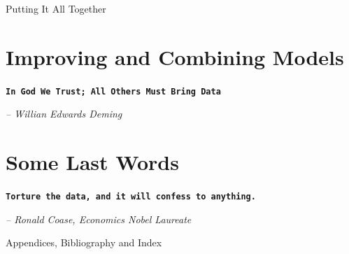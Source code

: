 \documentclass[11pt, letterpaper, twoside]{memoir}\usepackage{knitr}
\makeatletter
\newcommand{\chapterendsymbol}{
    \vspace{24pt}
    \Huge
    \hrulefill \hspace{0.1in} \hspace{0.1in} \hrulefill
    \normalsize
    }
\renewcommand\part{%
  \if@openright
    \cleardoublepage
  \else
    \clearpage
  \fi
  \thispagestyle{empty}
  \null\vfil
  \secdef\@part\@spart
  }
\makeatother
\begin{document}
\vspace{12pt}

\chapterendsymbol



\part{Putting It All Together}




\chapter{Improving and Combining Models}

\begin{flushright}

\textbf{\texttt{In God We Trust; All Others Must Bring Data}}

\emph{-- Willian Edwards Deming}

\end{flushright}

\vspace{12pt}

\chapterendsymbol





\chapter{Some Last Words}

\begin{flushright}

\textbf{\texttt{Torture the data, and it will confess to anything.}}

\emph{-- Ronald Coase, Economics Nobel Laureate}

\end{flushright}

\vspace{12pt}


\chapterendsymbol



\part{Appendices, Bibliography and Index}

\appendix



\end{document}
